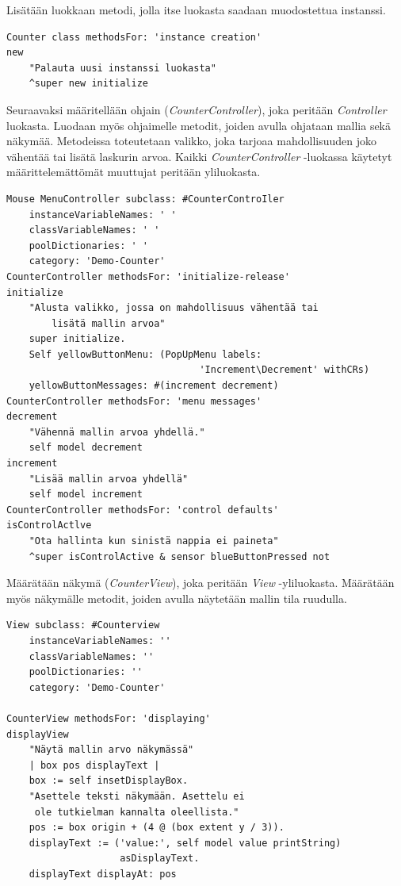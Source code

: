 \documentclass[finnish,utf8,nonumbib,palatino,kandi]{gradu2}
\begin{document}
Lisätään luokkaan metodi, jolla itse luokasta saadaan muodostettua instanssi.

\begin{lstlisting}[language=Smalltalk]
Counter class methodsFor: 'instance creation'
new
	"Palauta uusi instanssi luokasta"
	^super new initialize
\end{lstlisting}

Seuraavaksi määritellään ohjain (\emph{CounterController}), joka peritään
\emph{Controller} luokasta. Luodaan myös ohjaimelle metodit, joiden avulla
ohjataan mallia sekä näkymää. Metodeissa toteutetaan valikko, joka tarjoaa
mahdollisuuden joko vähentää tai lisätä laskurin arvoa. Kaikki \emph{CounterController} -luokassa käytetyt
määrittelemättömät muuttujat peritään yliluokasta.

\begin{lstlisting}[language=Smalltalk]
Mouse MenuController subclass: #CounterControIler
	instanceVariableNames: ' '
  	classVariableNames: ' '
  	poolDictionaries: ' '
  	category: 'Demo-Counter'
CounterController methodsFor: 'initialize-release'
initialize
	"Alusta valikko, jossa on mahdollisuus vähentää tai 
        lisätä mallin arvoa"
  	super initialize.
  	Self yellowButtonMenu: (PopUpMenu labels: 
                                  'Increment\Decrement' withCRs)
  	yellowButtonMessages: #(increment decrement)
CounterController methodsFor: 'menu messages'
decrement
	"Vähennä mallin arvoa yhdellä."
 	self model decrement
increment
	"Lisää mallin arvoa yhdellä"
	self model increment
CounterController methodsFor: 'control defaults'
isControlActlve
	"Ota hallinta kun sinistä nappia ei paineta"
	^super isControlActive & sensor blueButtonPressed not
\end{lstlisting}

Määrätään näkymä (\emph{CounterView}), joka peritään \emph{View} -yliluokasta. Määrätään
myös näkymälle metodit, joiden avulla näytetään mallin tila ruudulla.

\begin{lstlisting}[language=Smalltalk]
View subclass: #Counterview
	instanceVariableNames: ''
	classVariableNames: ''
	poolDictionaries: ''
	category: 'Demo-Counter'

CounterView methodsFor: 'displaying'
displayView
	"Näytä mallin arvo näkymässä"
	| box pos displayText |
	box := self insetDisplayBox.
	"Asettele teksti näkymään. Asettelu ei
	 ole tutkielman kannalta oleellista."
	pos := box origin + (4 @ (box extent y / 3)).
	displayText := ('value:', self model value printString)
					asDisplayText.
	displayText displayAt: pos
\end{lstlisting}
\end{document}
